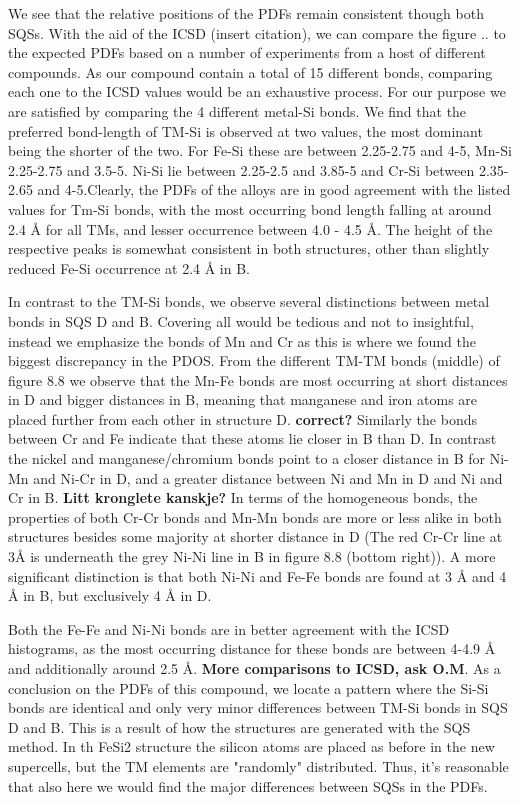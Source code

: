 We see that the relative positions of the PDFs remain consistent though both SQSs. With the aid of the ICSD (insert citation), we can compare the figure .. to the expected PDFs based on a number of experiments from a host of different compounds. As our compound contain a total of 15 different bonds, comparing each one to the ICSD values would be an exhaustive process. For our purpose we are satisfied by comparing the 4 different metal-Si bonds. We find that the preferred bond-length of TM-Si is observed at two values, the most dominant being the shorter of the two. For Fe-Si these are between 2.25-2.75 and 4-5, Mn-Si 2.25-2.75 and 3.5-5. Ni-Si lie between 2.25-2.5 and 3.85-5 and Cr-Si between 2.35-2.65 and 4-5.Clearly, the PDFs of the alloys are in good agreement with the listed values for Tm-Si bonds, with the most occurring bond length falling at around 2.4 Å for all TMs, and lesser occurrence between 4.0 - 4.5 Å. The height of the respective peaks is somewhat consistent in both structures, other than slightly reduced Fe-Si occurrence at 2.4 Å in B.

In contrast to the TM-Si bonds, we observe several distinctions between metal bonds in SQS D and B. Covering all would be tedious and not to insightful, instead we emphasize the bonds of Mn and Cr as this is where we found the biggest discrepancy in the PDOS. From the different TM-TM bonds (middle) of figure 8.8 we observe that the Mn-Fe bonds are most occurring at short distances in D and bigger distances in B, meaning that manganese and iron atoms are placed further from each other in structure D. \textbf{correct?} Similarly the bonds between Cr and Fe   indicate that these atoms lie closer in B than D. In contrast the nickel and manganese/chromium bonds point to a closer distance in B for Ni-Mn and Ni-Cr in D, and a greater distance between Ni and Mn in D and Ni and Cr in B. \textbf{Litt kronglete kanskje?} In terms of the homogeneous bonds, the properties of both Cr-Cr bonds and Mn-Mn bonds are more or less alike in both structures besides some majority at shorter distance in D (The red Cr-Cr line at 3Å is underneath the grey Ni-Ni line in B in figure 8.8 (bottom right)). A more significant distinction is that both Ni-Ni and Fe-Fe bonds are found at 3 Å and 4 Å in B, but exclusively 4 Å in D.    

Both the Fe-Fe and Ni-Ni bonds are in better agreement with the ICSD histograms, as the most occurring distance for these bonds are between 4-4.9 Å and additionally around 2.5 Å. \textbf{More comparisons to ICSD, ask O.M}. As a conclusion on the PDFs of this compound, we locate a pattern where the Si-Si bonds are identical and only very minor differences between TM-Si bonds in SQS D and B. This is a result of how the structures are generated with the SQS method. In th FeSi2 structure the silicon atoms are placed as before in the new supercells, but the TM elements are "randomly" distributed. Thus, it's reasonable that also here we would find the major differences between SQSs in the PDFs.
 

